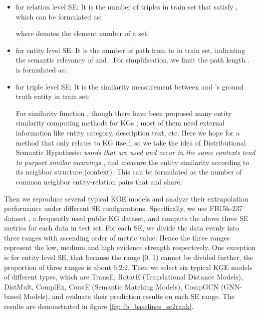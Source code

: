 \documentclass[letterpaper]{article} \usepackage{aaai22}  \usepackage{times}  \usepackage{helvet}  \usepackage{courier}  \usepackage[hyphens]{url}  \usepackage{graphicx} \urlstyle{rm} \def\UrlFont{\rm}  \usepackage{natbib}  \usepackage{caption} \DeclareCaptionStyle{ruled}{labelfont=normalfont,labelsep=colon,strut=off} \frenchspacing  \setlength{\pdfpagewidth}{8.5in}  \setlength{\pdfpageheight}{11in}  \usepackage{algorithm}
\begin{document}
\begin{itemize}
    \item  for relation level SE: It is the number of triples in train set that satisfy , which can be formulated as: 
     
    where  denotes the element number of a set. 
    \item  for entity level SE: It is the number of path from  to  in train set, indicating the semantic relevancy of  and . For simplification, we limit the path length .  is formulated as:
     
    \item  for triple level SE: It is the similarity measurement between  and 's ground truth entity  in train set:  
    
    For similarity function , though there have been proposed many entity similarity computing methods for KGs \cite{IKDD_2015_Choudhury_SimCat, TKDE_2017_Zhu_Concept, IEEE_2018_Sun_Topic_Sim}, most of them need external information like entity category, description text, etc. Here we hope for a method that only relates to KG itself, so we take the idea of Distributional Semantic Hypothesis: \textit{words that are used and occur in the same contexts tend to purport similar meanings} \cite{1954_Harris_Distribution}, and measure the entity similarity according to its neighbor structure (context). 
    This can be formulated as the number of common neighbor entity-relation pairs that  and  share:
    
\end{itemize}

Then we reproduce several typical KGE models and analyze their extrapolation performance under different SE configurations. Specifically, we use FB15k-237 dataset \cite{2015_Toutanova_FB15k-237}, a frequently used public KG dataset, and compute the above three SE metrics for each data  in test set. For each SE, we divide the data evenly into three ranges with ascending order of metric value. Hence the three ranges represent the low, medium and high evidence strength respectively. 
One exception is for entity level SE, that because the range [0, 1) cannot be divided further, the proportion of three ranges is about 6:2:2.
Then we select six typical KGE models of different types, which are TransE, RotatE (Translational Distance Models), DistMult, ComplEx, ConvE (Semantic Matching Models), CompGCN (GNN-based Models), and evaluate their prediction results on each SE range. The results are demonstrated in figure \ref{fig: fb_baselines_se2rank}. 
\end{document}
